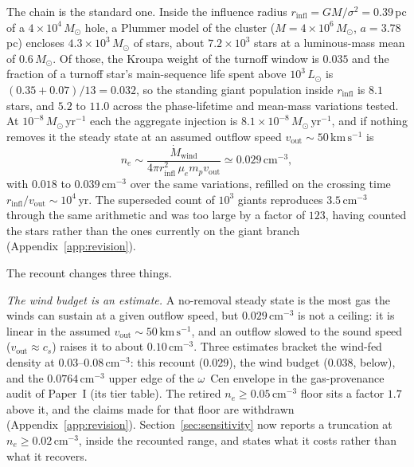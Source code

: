 \documentclass[11pt]{article}
\newcommand{\msun}{\ensuremath{M_\odot}}
\newcommand{\ocen}{$\omega$~Cen}
\begin{document}
The chain is the standard one. Inside the influence radius $r_{\mathrm{infl}} = GM/\sigma^{2} = 0.39$\,pc of a $4\times10^{4}\,\msun$ hole, a Plummer model of the cluster ($M = 4\times10^{6}\,\msun$, $a = 3.78$\,pc) encloses $4.3\times10^{3}\,\msun$ of stars, about $7.2\times10^{3}$ stars at a luminous-mass mean of $0.6\,\msun$. Of those, the Kroupa weight of the turnoff window is $0.035$ and the fraction of a turnoff star's main-sequence life spent above $10^{3}\,L_{\odot}$ is $(0.35 + 0.07)/13 = 0.032$, so the standing giant population inside $r_{\mathrm{infl}}$ is $8.1$ stars, and $5.2$ to $11.0$ across the phase-lifetime and mean-mass variations tested. At $10^{-8}\,\msun\,\mathrm{yr^{-1}}$ each the aggregate injection is $8.1\times10^{-8}\,\msun\,\mathrm{yr^{-1}}$, and if nothing removes it the steady state at an assumed outflow speed $v_{\mathrm{out}} \sim 50\,\mathrm{km\,s^{-1}}$ is
\begin{equation}
n_{e} \sim \frac{\dot{M}_{\mathrm{wind}}}{4\pi r_{\mathrm{infl}}^{2}\,\mu_{e} m_{p} v_{\mathrm{out}}} \simeq 0.029\,\mathrm{cm^{-3}},
\end{equation}
with $0.018$ to $0.039\,\mathrm{cm^{-3}}$ over the same variations, refilled on the crossing time $r_{\mathrm{infl}}/v_{\mathrm{out}} \sim 10^{4}$\,yr. The superseded count of $10^{3}$ giants reproduces $3.5\,\mathrm{cm^{-3}}$ through the same arithmetic and was too large by a factor of $123$, having counted the stars rather than the ones currently on the giant branch (Appendix~\ref{app:revision}).

The recount changes three things.

\emph{The wind budget is an estimate.} A no-removal steady state is the most gas the winds can sustain at a given outflow speed, but $0.029\,\mathrm{cm^{-3}}$ is not a ceiling: it is linear in the assumed $v_{\mathrm{out}} \sim 50\,\mathrm{km\,s^{-1}}$, and an outflow slowed to the sound speed ($v_{\mathrm{out}} \approx c_{s}$) raises it to about $0.10\,\mathrm{cm^{-3}}$. Three estimates bracket the wind-fed density at 0.03--0.08\,$\mathrm{cm^{-3}}$: this recount ($0.029$), the \citet{Haggard2013} wind budget ($0.038$, below), and the $0.0764\,\mathrm{cm^{-3}}$ upper edge of the \ocen{} envelope in the gas-provenance audit of Paper~I (its tier table). The retired $n_{e} \geq 0.05\,\mathrm{cm^{-3}}$ floor sits a factor $1.7$ above it, and the claims made for that floor are withdrawn (Appendix~\ref{app:revision}). Section~\ref{sec:sensitivity} now reports a truncation at $n_{e} \geq 0.02\,\mathrm{cm^{-3}}$, inside the recounted range, and states what it costs rather than what it recovers.
\end{document}
